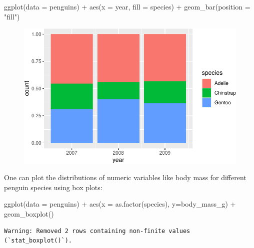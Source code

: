 \documentclass[
  letterpaper,
  DIV=11,
  numbers=noendperiod]{scrreprt}
\newenvironment{Shaded}{\begin{snugshade}}{\end{snugshade}}
\newcommand{\AttributeTok}[1]{\textcolor[rgb]{0.40,0.45,0.13}{#1}}
\newcommand{\FunctionTok}[1]{\textcolor[rgb]{0.28,0.35,0.67}{#1}}
\newcommand{\NormalTok}[1]{\textcolor[rgb]{0.00,0.23,0.31}{#1}}
\newcommand{\SpecialCharTok}[1]{\textcolor[rgb]{0.37,0.37,0.37}{#1}}
\newcommand{\StringTok}[1]{\textcolor[rgb]{0.13,0.47,0.30}{#1}}
\begin{document}
\begin{Shaded}
\begin{Highlighting}[]
\FunctionTok{ggplot}\NormalTok{(}\AttributeTok{data =}\NormalTok{ penguins) }\SpecialCharTok{+}
  \FunctionTok{aes}\NormalTok{(}\AttributeTok{x =}\NormalTok{ year, }\AttributeTok{fill =}\NormalTok{ species) }\SpecialCharTok{+} 
  \FunctionTok{geom\_bar}\NormalTok{(}\AttributeTok{position =} \StringTok{"fill"}\NormalTok{)}
\end{Highlighting}
\end{Shaded}

\begin{figure}[H]

{\centering \includegraphics{./02-probdist_files/figure-pdf/unnamed-chunk-2-2.pdf}

}

\end{figure}

One can plot the distributions of numeric variables like body mass for
different penguin species using box plots:

\begin{Shaded}
\begin{Highlighting}[]
\FunctionTok{ggplot}\NormalTok{(}\AttributeTok{data =}\NormalTok{ penguins) }\SpecialCharTok{+} \FunctionTok{aes}\NormalTok{(}\AttributeTok{x =} \FunctionTok{as.factor}\NormalTok{(species), }\AttributeTok{y=}\NormalTok{body\_mass\_g) }\SpecialCharTok{+} \FunctionTok{geom\_boxplot}\NormalTok{()}
\end{Highlighting}
\end{Shaded}

\begin{verbatim}
Warning: Removed 2 rows containing non-finite values (`stat_boxplot()`).
\end{verbatim}
\end{document}
